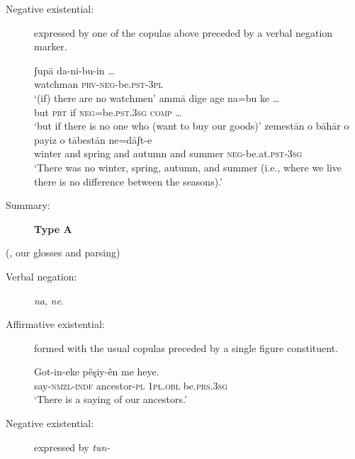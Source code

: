 \documentclass[output=paper,colorlinks,citecolor=brown]{langscibook}
\begin{document}
\begin{paperappendix}
\begin{unindented}
\begin{description}
\item[Negative existential:] expressed by one of the copulas above preceded by a verbal negation marker.

\begin{exe}\ex \gll ʃupā da-ni-bu-in … \\
watchman \textsc{prv}-\textsc{neg}-be.\textsc{pst}-\textsc{3pl} \\
    \glt `(if) there are no watchmen' \parencite[84]{ShokriJahani2013}
\ex \gll ammā dige  age  na=bu ke … \\
but \textsc{prt} if \textsc{neg}=be.\textsc{pst}.\textsc{3sg} \textsc{comp}  … \\
    \glt `but if there is no one who (want to buy our goods)'
\parencite[82]{ShokriJahani2013}
\ex \gll zemestān o bāhār  o payiz o tābestān ne=dāʃt-e \\
winter and spring and autumn and summer \textsc{neg}-be.at.\textsc{pst-3sg}\\
    \glt `There was no winter, spring, autumn, and summer (i.e., where we live there is no difference between the seasons).' \parencite[65]{ShokriJahani2013}
    \end{exe} 

\item[Summary:] \textbf{Type A}
\end{description}
 (\citealt{Thackston2006}, our glosses and parsing)

\begin{description}
\item[Verbal negation:] \textit{na}, \textit{ne}.\\
\item[Affirmative existential:] formed with the usual copulas preceded by a single figure constituent.

\begin{exe}\ex \gll Got-in-eke pêşiy-ên me heye.  \\
say-\textsc{nmzl}-\textsc{indf}   ancestor-\textsc{pl} \textsc{1pl}.\textsc{obl}   be.\textsc{prs.3sg} \\
    \glt `There is a saying of our ancestors.' \parencite[31]{Thackston2006}
    \end{exe} 

\item[Negative existential:] expressed by \textit{tun-} 


\end{description}
\end{unindented}
\end{paperappendix}
\end{document}
